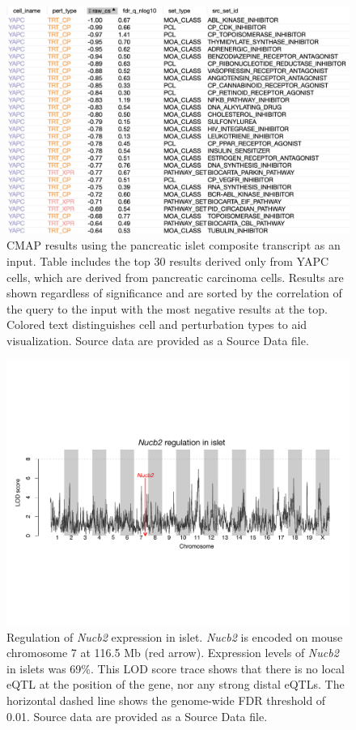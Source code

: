 \documentclass[
]{article}
\begin{document}
\begin{figure}[ht!]
\includegraphics[width=\textwidth]{Figures/Supp_Fig_Islet_YAPC.png} 
\caption{CMAP results using the pancreatic islet composite 
transcript as an input. Table includes the top 30 results derived
only from YAPC cells, which are derived from pancreatic
carcinoma cells. Results are shown regardless of significance and
are sorted by the correlation of the query to the input 
with the most negative results at the top. Colored text 
distinguishes cell and perturbation types to aid visualization. 
Source data are provided as a Source Data file.
}
\label{fig:clue_islet_yapc}
\end{figure}

\begin{figure}[ht!]
\includegraphics[width=\textwidth]{Figures/Supp_Fig14_Nucb2_eQTL.pdf} 
\caption{Regulation of \textit{Nucb2} expression in islet. \textit{Nucb2} 
is encoded on mouse chromosome 7 at 116.5 Mb (red arrow). Expression 
levels of \textit{Nucb2} in islets was 69\%. This LOD score trace 
shows that there is no local eQTL at the position of the gene, nor 
any strong distal eQTLs. The horizontal dashed line shows the 
genome-wide FDR threshold of 0.01. Source data are provided as 
a Source Data file.
}
\label{fig:Nucb2_eqtl}
\end{figure}
\end{document}
